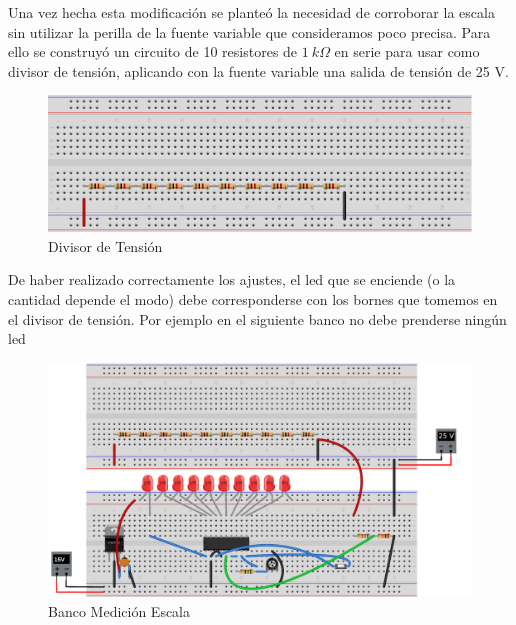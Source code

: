 \documentclass[12pt,a4paper]{article}
\begin{document}
			Una vez hecha esta modificación se planteó la necesidad de corroborar la escala sin utilizar la perilla de la fuente variable que consideramos poco precisa. Para ello se construyó un circuito de 10 resistores de $1 \: k\Omega$ en serie para usar como divisor de tensión, aplicando con la fuente variable una salida de tensión de 25 V.

			\begin{figure}[H]
			\centering
				\includegraphics[scale=1]{images/div.pdf}\caption{Divisor de Tensión}\label{fig:divtens}
			\end{figure}

			De haber realizado correctamente los ajustes, el led que se enciende (o la cantidad depende el modo) debe corresponderse con los bornes que tomemos en el divisor de tensión. Por ejemplo en el siguiente banco no debe prenderse ningún led
			
			\begin{figure}[H]
			\centering
				\includegraphics[scale=0.8]{images/labo1_bb3.pdf}\caption{Banco Medición Escala}
			\end{figure}
\end{document}
